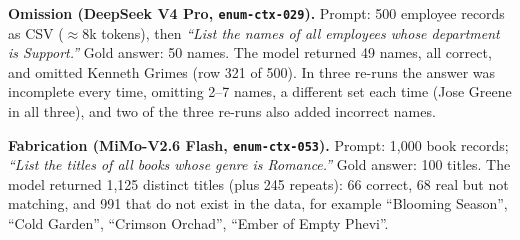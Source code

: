 \textbf{Omission (DeepSeek V4 Pro, \texttt{enum-ctx-029}).} Prompt: 500 employee records as CSV ($\approx$8k tokens), then \emph{``List the names of all employees whose department is Support.''} Gold answer: 50 names. The model returned 49 names, all correct, and omitted Kenneth Grimes (row 321 of 500). In three re-runs the answer was incomplete every time, omitting 2--7 names, a different set each time (Jose Greene in all three), and two of the three re-runs also added incorrect names.

\textbf{Fabrication (MiMo-V2.6 Flash, \texttt{enum-ctx-053}).} Prompt: 1,000 book records; \emph{``List the titles of all books whose genre is Romance.''} Gold answer: 100 titles. The model returned 1,125 distinct titles (plus 245 repeats): 66 correct, 68 real but not matching, and 991 that do not exist in the data, for example ``Blooming Season'', ``Cold Garden'', ``Crimson Orchad'', ``Ember of Empty Phevi''.
